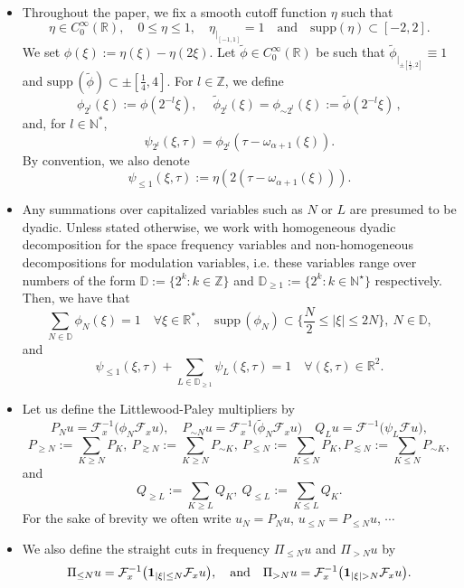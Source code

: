 \documentclass{amsart}
\theoremstyle{definition}
\theoremstyle{remark}
\def\R{{\mathbb R}}
\newcommand{\N}{\mathbb{N}}
\numberwithin{equation}{section}
\begin{document}
\begin{itemize}
\item Throughout the paper, we fix a smooth cutoff function $\eta$ such that
\begin{equation}\label{eta}
\eta \in C_0^{\infty}(\mathbb R), \quad 0 \le \eta \le 1, \quad
\eta_{|_{[-1,1]}}=1 \quad \mbox{and} \quad  \mbox{supp}(\eta)
\subset [-2,2].
\end{equation}
We set  $ \phi(\xi):=\eta(\xi)-\eta(2\xi)$. Let  $\widetilde{\phi} \in C_0^{\infty}(\mathbb R)$ be such that $\widetilde{\phi}_{|_{\pm [\frac12,2]}} \equiv 1$ and $\text{supp} \, (\widetilde{\phi}) \subset \pm [\frac14,4]$. For $l \in \mathbb Z$, we define
$$
\phi_{2^l}(\xi):=\phi(2^{-l}\xi), \quad \ \widetilde{\phi}_{2^l}(\xi)=\phi_{\sim 2^l}(\xi):=\widetilde{\phi}(2^{-l}\xi) \, ,
$$
and, for $ l\in \N^* $,
$$
\psi_{2^{l}}(\xi,\tau)=\phi_{2^{l}}(\tau-\omega_{\alpha+1}(\xi)).
$$
By convention, we also denote
$$
\psi_{{\le 1}}(\xi,\tau):=\eta(2(\tau-\omega_{\alpha+1}(\xi))).
$$
\item Any summations over capitalized variables such as $N$ or $L$ are presumed to be dyadic. Unless stated otherwise, we work with homogeneous dyadic decomposition for the space frequency variables and non-homogeneous decompositions for modulation variables, i.e. these variables range over numbers of the form $\mathbb D:=\{2^k : k\in\mathbb Z\}$ and $\mathbb D_{\ge 1}:=\{2^k : k\in\mathbb N^{\star}\}$ respectively.  Then, we have that
$$
\sum_{N \in \mathbb D}\phi_N(\xi)=1\quad \forall \xi\in \R^*, \quad \mbox{supp} \, (\phi_N) \subset
\{\frac{N}{2}\le |\xi| \le 2N\}, \ N \in \mathbb D,
$$
and
$$
\psi_{\le 1}(\xi,\tau)+\sum_{L\in \mathbb D_{\ge 1}}\psi_L(\xi,\tau)=1 \quad \forall (\xi,\tau)\in\R^2.
$$

\item Let us define the Littlewood-Paley multipliers by
$$
P_Nu=\mathcal{F}^{-1}_x\big(\phi_N\mathcal{F}_xu\big), \quad P_{ \sim N}u=\mathcal{F}^{-1}_x\big(\widetilde{\phi}_N\mathcal{F}_xu\big) \quad
Q_Lu=\mathcal{F}^{-1}\big(\psi_L\mathcal{F}u\big),
$$ 
 $$P_{\ge N}:=\sum_{K \ge N} P_{K}, \ P_{\gtrsim N}:=\sum_{K \ge N} P_{\sim K}, \ P_{\le N}:=\sum_{K \le N} P_{K}, P_{\lesssim N}:=\sum_{K \le N} P_{\sim K}, $$ 
 and 
 $$Q_{\ge L}:=\sum_{K \ge L} Q_{K}, \    Q_{\le L}:=\sum_{K \le L} Q_{K}. $$ 
 For the sake of brevity we often write $u_N=P_Nu$, $u_{\le N}=P_{\le N}u$, $\cdots$
 
 \item We also define the straight cuts in frequency  $\Pi_{ \le N}u$ and $\Pi_{>N}u$ by 
 $$
\Pi_{ \le N}u=\mathcal{F}^{-1}_x\big({\bf 1}_{|\xi| \le N}\mathcal{F}_xu\big), \quad \text{and} \quad \Pi_{>N}u=\mathcal{F}^{-1}_x\big({\bf 1}_{|\xi| > N}\mathcal{F}_xu\big).
$$ 



\end{itemize}
\end{document}
